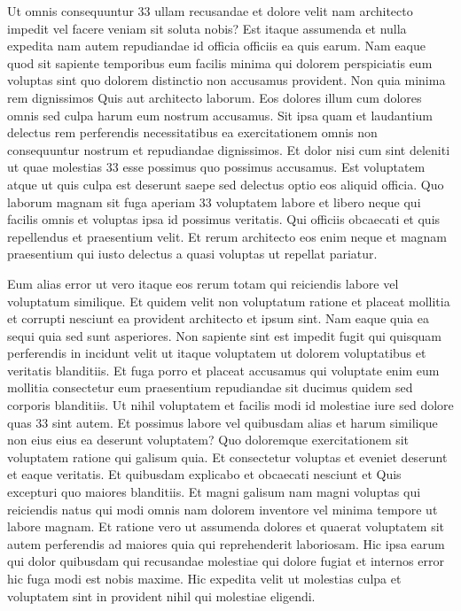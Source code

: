 \documentclass[a4paper,12pt]{report}
\begin{document}
\par Ut omnis consequuntur 33 ullam recusandae et dolore velit nam architecto impedit vel facere veniam sit soluta nobis? Est itaque assumenda et nulla expedita nam autem repudiandae id officia officiis ea quis earum. Nam eaque quod sit sapiente temporibus eum facilis minima qui dolorem perspiciatis eum voluptas sint quo dolorem distinctio non accusamus provident. Non quia minima rem dignissimos Quis aut architecto laborum. Eos dolores illum cum dolores omnis sed culpa harum eum nostrum accusamus. Sit ipsa quam et laudantium delectus rem perferendis necessitatibus ea exercitationem omnis non consequuntur nostrum et repudiandae dignissimos. Et dolor nisi cum sint deleniti ut quae molestias 33 esse possimus quo possimus accusamus. Est voluptatem atque ut quis culpa est deserunt saepe sed delectus optio eos aliquid officia. Quo laborum magnam sit fuga aperiam 33 voluptatem labore et libero neque qui facilis omnis et voluptas ipsa id possimus veritatis. Qui officiis obcaecati et quis repellendus et praesentium velit. Et rerum architecto eos enim neque et magnam praesentium qui iusto delectus a quasi voluptas ut repellat pariatur. 

\par Eum alias error ut vero itaque eos rerum totam qui reiciendis labore vel voluptatum similique. Et quidem velit non voluptatum ratione et placeat mollitia et corrupti nesciunt ea provident architecto et ipsum sint. Nam eaque quia ea sequi quia sed sunt asperiores. Non sapiente sint est impedit fugit qui quisquam perferendis in incidunt velit ut itaque voluptatem ut dolorem voluptatibus et veritatis blanditiis. Et fuga porro et placeat accusamus qui voluptate enim eum mollitia consectetur eum praesentium repudiandae sit ducimus quidem sed corporis blanditiis. Ut nihil voluptatem et facilis modi id molestiae iure sed dolore quas 33 sint autem. Et possimus labore vel quibusdam alias et harum similique non eius eius ea deserunt voluptatem? Quo doloremque exercitationem sit voluptatem ratione qui galisum quia. Et consectetur voluptas et eveniet deserunt et eaque veritatis. Et quibusdam explicabo et obcaecati nesciunt et Quis excepturi quo maiores blanditiis. Et magni galisum nam magni voluptas qui reiciendis natus qui modi omnis nam dolorem inventore vel minima tempore ut labore magnam. Et ratione vero ut assumenda dolores et quaerat voluptatem sit autem perferendis ad maiores quia qui reprehenderit laboriosam. Hic ipsa earum qui dolor quibusdam qui recusandae molestiae qui dolore fugiat et internos error hic fuga modi est nobis maxime. Hic expedita velit ut molestias culpa et voluptatem sint in provident nihil qui molestiae eligendi. 
\end{document}
